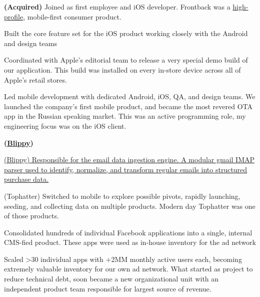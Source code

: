 \documentclass[]{plushcv}
\begin{document}
\begin{minipage}[t]{0.74\textwidth}
 \textbf{(Acquired)}
Joined as first employee and iOS developer. Frontback was a \href{https://techcrunch.com/tag/frontback/}{high-profile}, mobile-first consumer product.
\begin{tightemize}
\item Built the core feature set for the iOS product working closely with the Android and design teams
\item Coordinated with Apple’s editorial team to release a very special demo build of our application. This build was installed on every in-store device across all of Apple's retail stores.
\end{tightemize}
\sectionsep

\begin{tightemize}
\item Led mobile development with dedicated Android, iOS, QA, and design teams. We launched the company's first mobile product, and became the most revered OTA app in the Russian speaking market. This was an active programming role, my engineering focus was on the iOS client.
\end{tightemize}
\sectionsep

 \textbf{(\href{https://techcrunch.com/tag/blippy/}{Blippy})}
\begin{tightemize}
\item \href{https://techcrunch.com/2010/04/01/blippy-amazon/}{(Blippy) Responsible for the email data ingestion engine. A modular gmail IMAP parser used to identify, normalize, and transform regular emails into structured purchase data.}
\item (Tophatter) Switched to mobile to explore possible pivots, rapidly launching, seeding, and collecting data on multiple products. Modern day Tophatter was one of those products.
\end{tightemize}
\sectionsep


\begin{tightemize}
\item Consolidated hundreds of individual Facebook applications into a single, internal CMS-fied product. These apps were used as in-house inventory for the ad network
\item Scaled >30 individual apps with +2MM monthly active users each, becoming extremely valuable inventory for our own ad network. What started as project to reduce technical debt, soon became a new organizational unit with an independent product team responsible for largest source of revenue.
\end{tightemize}
\sectionsep




\end{minipage}
\end{document}
